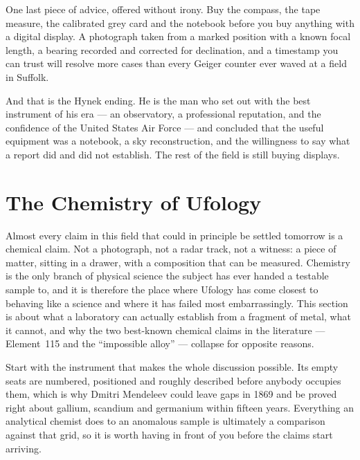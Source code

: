 One last piece of advice, offered without irony. Buy the compass, the tape measure, the
calibrated grey card and the notebook before you buy anything with a digital display. A
photograph taken from a marked position with a known focal length, a bearing recorded and
corrected for declination, and a timestamp you can trust will resolve more cases than every
Geiger counter ever waved at a field in Suffolk.

And that is the Hynek ending. He is the man who set out with the best instrument of his era ---
an observatory, a professional reputation, and the confidence of the United States Air Force ---
and concluded that the useful equipment was a notebook, a sky reconstruction, and the willingness
to say what a report did and did not establish.  The rest of the field is still buying displays.


\section{The Chemistry of Ufology}\label{sec:chemistryufology}

Almost every claim in this field that could in principle be settled tomorrow is a chemical
claim. Not a photograph, not a radar track, not a witness: a piece of matter, sitting in a
drawer, with a composition that can be measured. Chemistry is the only branch of physical
science the subject has ever handed a testable sample to, and it is therefore the place where
Ufology has come closest to behaving like a science and where it has failed most
embarrassingly. This section is about what a laboratory can actually establish from a fragment
of metal, what it cannot, and why the two best-known chemical claims in the literature ---
Element~115 and the ``impossible alloy'' --- collapse for opposite reasons.

Start with the instrument that makes the whole discussion possible.  Its empty seats are
numbered, positioned and roughly described before anybody occupies them, which is why Dmitri
Mendeleev could leave gaps in 1869 and be proved right about gallium, scandium and germanium
within fifteen years. Everything an analytical chemist does to an anomalous sample is
ultimately a comparison against that grid, so it is worth having in front of you before the
claims start arriving.



